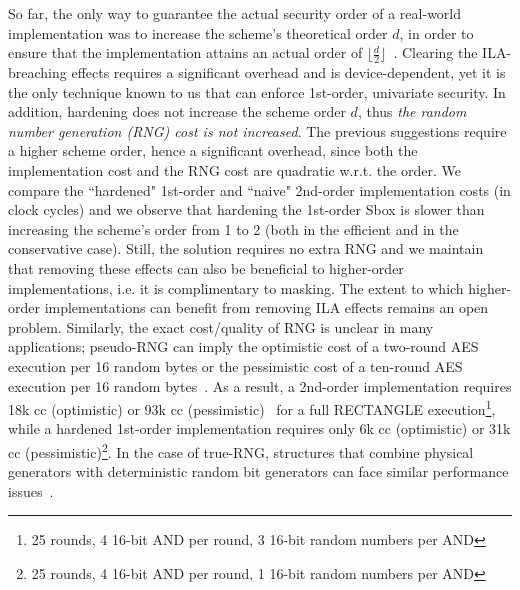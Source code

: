 So far, the only way to guarantee the actual security order of a real-world implementation was to increase the scheme's theoretical order $d$, in order to ensure that the implementation attains an actual order of $\lfloor \frac{d}{2} \rfloor$~\cite{DBLP:conf/cardis/BalaschGGRS14, DBLP:journals/iacr/GrootPPSB16}. Clearing the ILA-breaching effects requires a significant overhead and is device-dependent, yet it is the only technique known to us that can enforce 1st-order, univariate security. In addition, hardening does not increase the scheme order $d$, thus \emph{the random number generation (RNG) cost is not increased}. The previous suggestions require a higher scheme order, hence a significant overhead, since both the implementation cost and the RNG cost are quadratic w.r.t. the order. We compare the ``hardened" 1st-order and ``naive" 2nd-order implementation costs (in clock cycles) and we observe that hardening the 1st-order Sbox is slower than increasing the scheme's order from 1 to 2 (both in the efficient and in the conservative case). Still, the solution requires no extra RNG and we maintain that removing these effects can also be beneficial to higher-order implementations, i.e. it is complimentary to masking. The extent to which higher-order implementations can benefit from removing ILA effects remains an open problem. Similarly, the exact cost/quality of RNG is unclear in many applications; pseudo-RNG can imply the optimistic cost of a two-round AES execution per 16 random bytes or the pessimistic cost of a ten-round AES execution per 16 random bytes~\cite{DBLP:journals/jce/GrossoSF14}. As a result, a 2nd-order implementation requires 18k cc (optimistic) or 93k cc (pessimistic)~\cite{aes_atmega} for a full RECTANGLE execution\footnote{25 rounds, 4 16-bit AND per round, 3 16-bit random numbers per AND}, while a hardened 1st-order implementation requires only 6k cc (optimistic) or 31k cc (pessimistic)\footnote{25 rounds, 4 16-bit AND per round, 1 16-bit random numbers per AND}. In the case of true-RNG, structures that combine physical
generators with deterministic random bit generators can face similar performance issues~\cite{drbg}.



